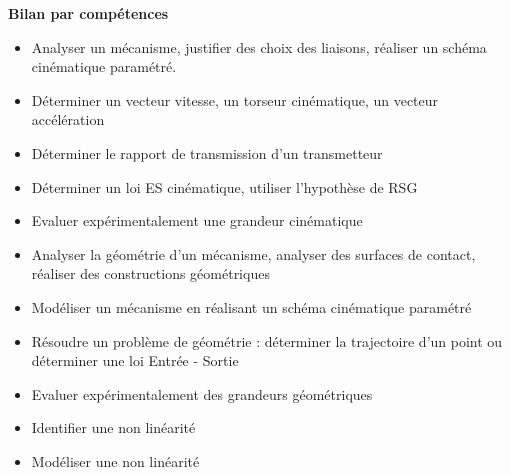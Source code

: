 \noindent \textbf{Bilan par compétences}
 
\begin{itemize} 
\item  \footnotesize {} \normalsize \hspace{.2cm}Analyser un mécanisme, justifier des choix des liaisons, réaliser un schéma cinématique paramétré.\hfill {}
\item  \footnotesize {} \normalsize \hspace{.2cm}Déterminer un vecteur vitesse, un torseur cinématique, un vecteur accélération\hfill {}
\item  \footnotesize {} \normalsize \hspace{.2cm}Déterminer le rapport de transmission d'un transmetteur\hfill {}
\item  \footnotesize {} \normalsize \hspace{.2cm}Déterminer un loi ES cinématique, utiliser l'hypothèse de RSG\hfill {}
\item  \footnotesize {} \normalsize \hspace{.2cm}Evaluer expérimentalement une grandeur cinématique\hfill {}
\item  \footnotesize {} \normalsize \hspace{.2cm}Analyser la géométrie d'un mécanisme, analyser des surfaces de contact, réaliser des constructions géométriques\hfill {}
\item  \footnotesize {} \normalsize \hspace{.2cm}Modéliser un mécanisme en réalisant un schéma cinématique paramétré\hfill {}
\item  \footnotesize {} \normalsize \hspace{.2cm}Résoudre un problème de géométrie : déterminer la trajectoire d'un point ou déterminer une loi Entrée - Sortie\hfill {}
\item  \footnotesize {} \normalsize \hspace{.2cm}Evaluer expérimentalement des grandeurs géométriques\hfill {}
\item  \footnotesize {} \normalsize \hspace{.2cm}Identifier une non linéarité\hfill {}
\item  \footnotesize {} \normalsize \hspace{.2cm}Modéliser une non linéarité\hfill {}

\end{itemize}
